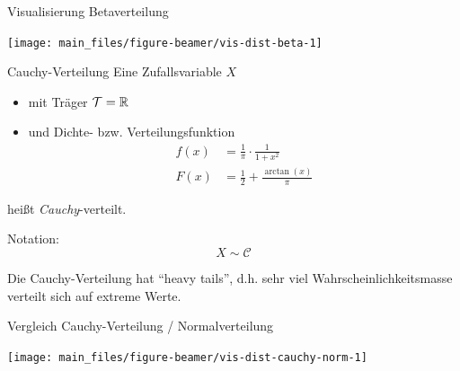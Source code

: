 \documentclass[
  10pt,
  ignorenonframetext,
]{beamer}
\providecommand{\tightlist}{%
  \setlength{\itemsep}{0pt}\setlength{\parskip}{0pt}}
\begin{document}
\begin{frame}{Visualisierung Betaverteilung}
\label{visualisierung-betaverteilung}
\scriptsize

\begin{center}\texttt{[image: main\_files/figure-beamer/vis-dist-beta-1]} \end{center}

\normalsize
\end{frame}

\begin{frame}{Cauchy-Verteilung}
\label{cauchy-verteilung}
Eine Zufallsvariable \(X\)

\begin{itemize}
\tightlist
\item
  mit Träger \({\cal T} = \mathbb{R}\)
\item
  und Dichte- bzw. Verteilungsfunktion \begin{align*}
  f(x) &=  \frac{1}{\pi} \cdot \frac{1}{1 + x^2} \\
  F(x) & =  \frac{1}{2} + \frac{\arctan(x)}{\pi}
  \end{align*}
\end{itemize}

heißt \emph{Cauchy}-verteilt.~

Notation: \[X \sim \mathcal C\]

Die Cauchy-Verteilung hat ``heavy tails'', d.h. sehr viel
Wahrscheinlichkeitsmasse verteilt sich auf extreme Werte.
\end{frame}

\begin{frame}{Vergleich Cauchy-Verteilung / Normalverteilung}
\label{vergleich-cauchy-verteilung-normalverteilung}
\scriptsize

\begin{center}\texttt{[image: main\_files/figure-beamer/vis-dist-cauchy-norm-1]} \end{center}

\normalsize
\end{frame}
\end{document}
